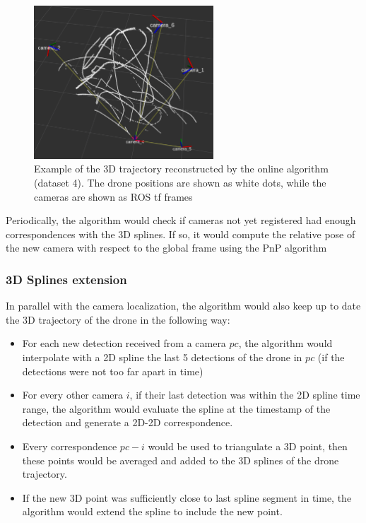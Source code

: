 \documentclass[11pt]{article}
\begin{document}
\begin{figure}[h]
    \centering
    \includegraphics[width=0.6\textwidth]{imgs/online_full_trajectory.png}
    \caption{Example of the 3D trajectory reconstructed by the online algorithm (dataset 4). The drone positions are shown as white dots, while the cameras are shown as ROS tf frames}
    \label{fig:online_full_trajectory}
\end{figure}

Periodically, the algorithm would check if cameras not yet registered had enough correspondences with the 3D splines. If so, it would compute the relative pose of the new camera with respect to the global frame using the PnP algorithm

\subsubsection{3D Splines extension}

In parallel with the camera localization, the algorithm would also keep up to date the 3D trajectory of the drone in the following way:

\begin{itemize}
    \item For each new detection received from a camera $pc$, the algorithm would interpolate with a 2D spline the last 5 detections of the drone in $pc$ (if the detections were not too far apart in time)
    \item For every other camera $i$, if their last detection was within the 2D spline time range, the algorithm would evaluate the spline at the timestamp of the detection and generate a 2D-2D correspondence.
    \item Every correspondence $pc-i$ would be used to triangulate a 3D point, then these points would be averaged and added to the 3D splines of the drone trajectory.
    \item If the new 3D point was sufficiently close to last spline segment in time, the algorithm would extend the spline to include the new point.
\end{itemize}
\end{document}
